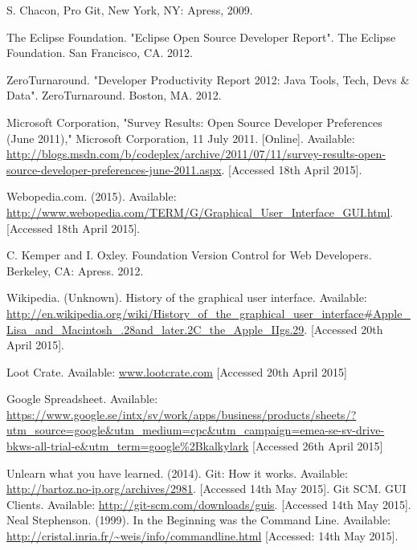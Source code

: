 \documentclass[a4paper,oneside]{bth} %
\begin{document}
\begin{thebibliography}{1}
			S. Chacon, Pro Git, New York, NY: Apress, 2009.
			
			The Eclipse Foundation. "Eclipse Open Source Developer Report". The Eclipse Foundation. San Francisco, CA. 2012.
			
			ZeroTurnaround. "Developer Productivity Report 2012: Java Tools, Tech, Devs \& Data". ZeroTurnaround. Boston, MA. 2012.
			
			Microsoft Corporation, "Survey Results: Open Source Developer Preferences (June 2011)," Microsoft Corporation, 11 July 2011. [Online]. Available: \url{http://blogs.msdn.com/b/codeplex/archive/2011/07/11/survey-results-open-source-developer-preferences-june-2011.aspx}. [Accessed 18th April 2015].
			
			Webopedia.com. (2015). Available: \url{http://www.webopedia.com/TERM/G/Graphical\_User\_Interface\_GUI.html}. [Accessed 18th April 2015].
			
			C. Kemper and I. Oxley. Foundation Version Control for Web Developers. Berkeley, CA: Apress. 2012.
			
			Wikipedia. (Unknown). History of the graphical user interface. Available: \url{http://en.wikipedia.org/wiki/History_of_the_graphical_user_interface#Apple_Lisa_and_Macintosh_.28and_later.2C_the_Apple_IIgs.29}.  [Accessed 20th April 2015].
			
			Loot Crate. Available: \url{www.lootcrate.com} [Accessed 20th April 2015]
			
			Google Spreadsheet. Available: \url{https://www.google.se/intx/sv/work/apps/business/products/sheets/?utm_source=google&utm_medium=cpc&utm_campaign=emea-se-sv-drive-bkws-all-trial-e&utm_term=google%2Bkalkylark} [Accessed 26th April 2015]
			
			Unlearn what you have learned. (2014). Git: How it works. Available: \url{http://bartoz.no-ip.org/archives/2981}. [Accessed 14th May 2015].
			Git SCM. GUI Clients. Available: \url{http://git-scm.com/downloads/guis}. [Accessed 14th May 2015].
			Neal Stephenson. (1999). In the Beginning was the Command Line. Available: \url{http://cristal.inria.fr/~weis/info/commandline.html}	[Accessed: 14th May 2015].	
			
		\end{thebibliography}
\end{document}
